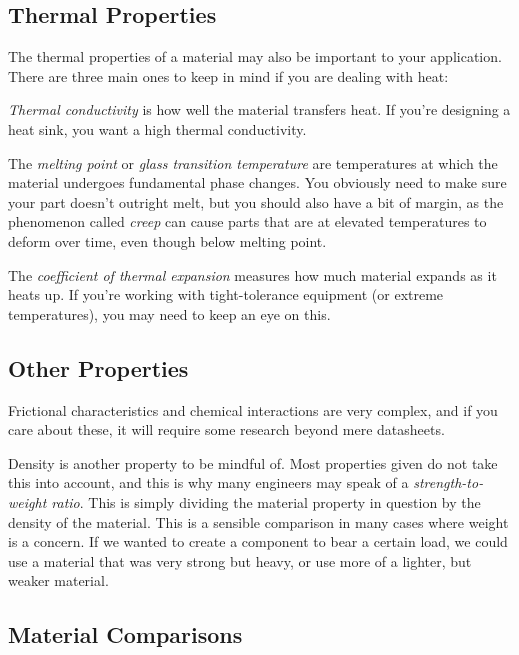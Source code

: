  \subsection{Thermal Properties}
 The thermal properties of a material may also be important to your application. There are three main ones to keep in mind if you are dealing with heat:
 \begin{asparaitem}
 	\item \textit{Thermal conductivity} is how well the material transfers heat. If you're designing a heat sink, you want a high thermal conductivity.
 	\item The \textit{melting point} or \textit{glass transition temperature} are temperatures at which the material undergoes fundamental phase changes. You obviously need to make sure your part doesn't outright melt, but you should also have a bit of margin, as the phenomenon called \textit{creep} can cause parts that are at elevated temperatures to deform over time, even though below melting point.
 	\item The \textit{coefficient of thermal expansion} measures how much material expands as it heats up. If you're working with tight-tolerance equipment (or extreme temperatures), you may need to keep an eye on this.
 \end{asparaitem}
  
\subsection{Other Properties} 
 
 Frictional characteristics and chemical interactions are very complex, and if you care about these, it will require some research beyond mere datasheets.
 
 Density is another property to be mindful of. Most properties given do not take this into account, and this is why many engineers may speak of a \textit{strength-to-weight ratio}. This is simply dividing the material property in question by the density of the material. This is a sensible comparison in many cases where weight is a concern. If we wanted to create a component to bear a certain load, we could use a material that was very strong but heavy, or use more of a lighter, but weaker material.
 
 \subsection{Material Comparisons}
 
